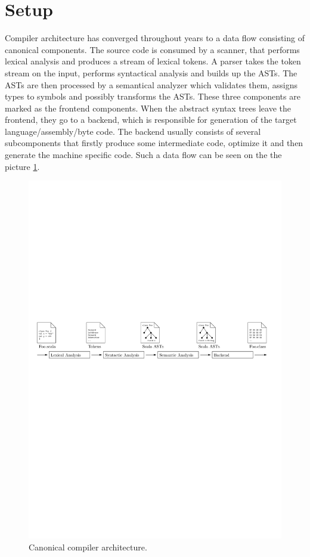\documentclass[12pt,a4paper]{report}
\begin{document}
\section{Setup}

Compiler architecture has converged throughout years to a data flow consisting of canonical components. The source code is consumed by a scanner, that performs lexical analysis and produces a stream of lexical tokens. A parser takes the token stream on the input, performs syntactical analysis and builds up the ASTs. The ASTs are then processed by a semantical analyzer which validates them, assigns types to symbols and possibly transforms the ASTs. These three components are marked as the frontend components. When the abstract syntax trees leave the frontend, they go to a backend, which is responsible for generation of the target language/assembly/byte code. The backend usually consists of several subcomponents that firstly produce some intermediate code, optimize it and then generate the machine specific code. Such a data flow can be seen on the the picture \ref{Compiler}.

\begin{figure}[ht]
  \centering
	\includegraphics[width=\linewidth,height=\textheight,keepaspectratio]{img/Compiler.pdf}
	\caption{Canonical compiler architecture.}
	\label{Compiler}
\end{figure}
\end{document}
